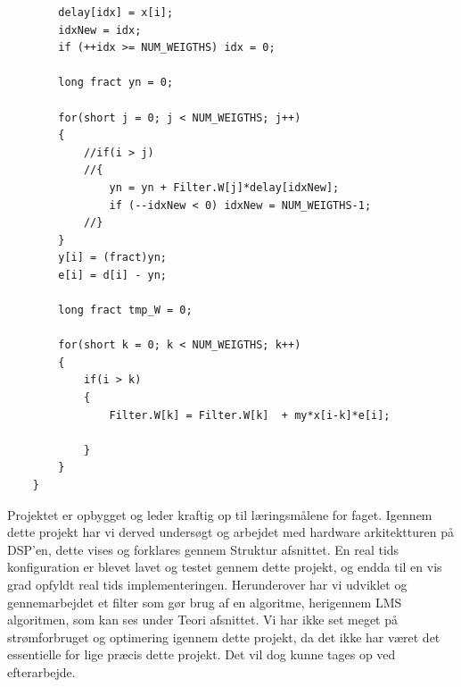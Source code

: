 \begin{description}[align=left]
\begin{lstlisting}
		delay[idx] = x[i];
		idxNew = idx;
		if (++idx >= NUM_WEIGTHS) idx = 0;

		long fract yn = 0;

		for(short j = 0; j < NUM_WEIGTHS; j++)
		{
			//if(i > j)
			//{
				yn = yn + Filter.W[j]*delay[idxNew];
				if (--idxNew < 0) idxNew = NUM_WEIGTHS-1;
			//}
		}
		y[i] = (fract)yn;
		e[i] = d[i] - yn;

		long fract tmp_W = 0;

		for(short k = 0; k < NUM_WEIGTHS; k++)
		{
			if(i > k)
			{
				Filter.W[k] = Filter.W[k]  + my*x[i-k]*e[i];

			}
		}
	}
\end{lstlisting}

\item [Læringsmål.] Projektet er opbygget og leder kraftig op til læringsmålene for faget. Igennem dette projekt har vi derved undersøgt og arbejdet med hardware arkitektturen på DSP'en, dette vises og forklares gennem Struktur afsnittet. En real tids konfiguration er blevet lavet og testet gennem dette projekt, og endda til en vis grad opfyldt real tids implementeringen. Herunderover har vi udviklet og gennemarbejdet et filter som gør brug af en algoritme, herigennem LMS algoritmen, som kan ses under Teori afsnittet. Vi har ikke set meget på strømforbruget og optimering igennem dette projekt, da det ikke har været det essentielle for lige præcis dette projekt. Det vil dog kunne tages op ved efterarbejde.    


\end{description}


